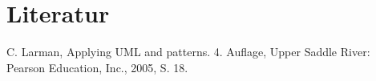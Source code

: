 \documentclass[a4paper,10pt,xetex]{article}
\begin{document}
\section{Literatur}\label{literatur}
\begin{thebibliography}{9}
   C. Larman, Applying UML and patterns. 4. Auflage, Upper Saddle River: Pearson Education, Inc., 2005, S. 18.
\end{thebibliography}
\end{document}
